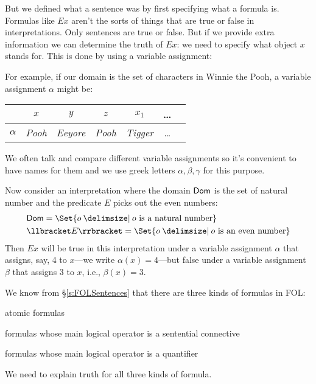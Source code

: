 But we defined what a sentence was by first specifying what a formula is. Formulas like $Ex$ aren't the sorts of things that are true or false in interpretations. Only sentences are true or false. But if we provide extra information we can determine the truth of $Ex$: we need to specify what object $x$ stands for. This is done by using a variable assignment: 

For example, if our domain is the set of characters in Winnie the Pooh, a variable assignment $\alpha$ might be:
\begin{center}
	\begin{tabular}{r@{\,:\quad}cccccc}
		\omit & $x$ & $y$ & $z$ & $x_1$ & \ldots \\ \hline
		$\alpha$ & \emph{Pooh} & \emph{Eeyore} & \emph{Pooh} & \emph{Tigger} & \ldots
	\end{tabular}
\end{center}



We often talk and compare different variable assignments so it's convenient to have names for them and we use greek letters $\alpha, \beta,\gamma$ for this purpose. 

Now consider an interpretation where the domain $\mathsf{Dom}$ is the set of natural number and the predicate $E$ picks out the even numbers:
\begin{align*}&\domain=\Set{o \given  o\text{ is a natural number}}\\
&\denote{E}=\Set{o \given o\text{ is an even number}}\end{align*}
Then $Ex$ will be true in this interpretation under a variable assignment $\alpha$ that assigns, say, 4 to $x$---we write $\alpha(x)=4$---but false under a variable assignment $\beta$ that assigns 3 to $x$, i.e., $\beta(x)=3$.




We know from \S\ref{s:FOLSentences} that there are three kinds of formulas in FOL:
	\begin{ebullet}
		\item atomic formulas
		\item formulas whose main logical operator is a sentential connective
		\item formulas whose main logical operator is a quantifier
	\end{ebullet}
We need to explain truth for all three kinds of formula.

